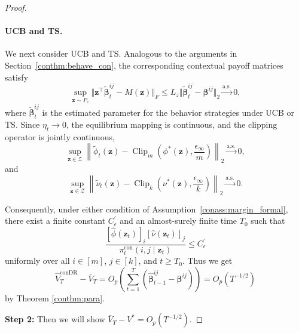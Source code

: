 \documentclass[12pt]{article}
\begin{document}
\begin{proof}
\paragraph{UCB and TS.}
We next consider UCB and TS. Analogous to the arguments in Section~\ref{conthm:behave_con}, the corresponding contextual payoff matrices satisfy
\[
\sup_{\bm z \sim P_z}
\Vert
\bm z ^\top \widetilde{\bm{\beta}}_t^{ij}-M(\bm z) 
\Vert_F \le L_z 
\Vert
\widetilde{\bm{\beta}}_t^{ij}- {\bm{\beta}}^{ij}
\Vert_2
\stackrel{\mathrm{a.s.}}{\to}
0,
\]
where $\widetilde{\bm{\beta}}_t^{ij}$ is the estimated parameter  for the behavior strategies under UCB or TS. Since $\eta_t\to0$, the equilibrium mapping is continuous, and the clipping operator is jointly continuous,
\[
\sup_{\bm z\in\mathcal Z}
\left\|
\widetilde{\phi}_t(\bm z)
-
\operatorname{Clip}_m
\left(
\phi^\ast(\bm z),
\frac{\epsilon_\infty}{m}
\right)
\right\|_2
\stackrel{\mathrm{a.s.}}{\to}
0,
\]
and
\[
\sup_{\bm z\in\mathcal Z}
\left\|
\widetilde{\nu}_t(\bm z)
-
\operatorname{Clip}_k
\left(
\nu^\ast(\bm z),
\frac{\epsilon_\infty}{k}
\right)
\right\|_2
\stackrel{\mathrm{a.s.}}{\to}
0.
\]

Consequently, under either condition of Assumption~\ref{conass:margin_formal}, there exist a finite constant $C_\epsilon^\prime$ and an almost-surely finite time $T_0$ such that
\[
\frac{
[\widehat{\phi}(\bm z_t)]_i
[\widehat{\nu}(\bm z_t)]_j
}{
\pi_t^\mathrm{con}(i,j\mid\bm z_t)
}
\le C_\epsilon^\prime
\]
uniformly over all $i\in[m]$, $j\in[k]$, and $t\ge T_0$.
Thus we get $$\widehat{V}_T^\text{conDR} - \bar{V}_T =  O_p\left(\sum_{t=1}^T \left(\widehat{\bm{\beta}}_{t-1}^{ij}-\bm{\beta}^{ij} \right)\right)=O_p(T^{-1/2})$$ by Theorem \ref{conthm:para}.


\textbf{Step 2:} Then we will show $\bar{V}_T - V^\ast = O_p(T^{-1/2})$.


\end{proof}
\end{document}
